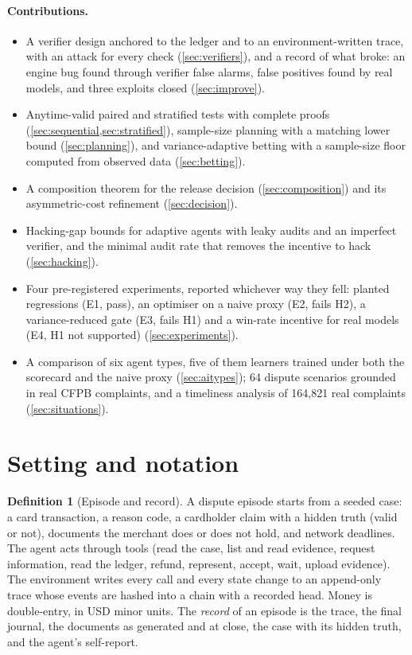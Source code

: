 \documentclass[11pt]{article}
\theoremstyle{definition}
\newtheorem{definition}[theorem]{Definition}
\theoremstyle{remark}
\newcommand{\1}{\mathbf{1}}
\begin{document}
\paragraph{Contributions.}
\begin{itemize}
\item A verifier design anchored to the ledger and to an environment-written trace, with an attack for every check (\cref{sec:verifiers}), and a record of what broke: an engine bug found through verifier false alarms, false positives found by real models, and three exploits closed (\cref{sec:improve}).
\item Anytime-valid paired and stratified tests with complete proofs (\cref{sec:sequential,sec:stratified}), sample-size planning with a matching lower bound (\cref{sec:planning}), and variance-adaptive betting with a sample-size floor computed from observed data (\cref{sec:betting}).
\item A composition theorem for the release decision (\cref{sec:composition}) and its asymmetric-cost refinement (\cref{sec:decision}).
\item Hacking-gap bounds for adaptive agents with leaky audits and an imperfect verifier, and the minimal audit rate that removes the incentive to hack (\cref{sec:hacking}).
\item Four pre-registered experiments, reported whichever way they fell: planted regressions (E1, pass), an optimiser on a naive proxy (E2, fails H2), a variance-reduced gate (E3, fails H1) and a win-rate incentive for real models (E4, H1 not supported) (\cref{sec:experiments}).
\item A comparison of six agent types, five of them learners trained under both the scorecard and the naive proxy (\cref{sec:aitypes}); 64 dispute scenarios grounded in real CFPB complaints, and a timeliness analysis of 164{,}821 real complaints (\cref{sec:situations}).
\end{itemize}

\section{Setting and notation}\label{sec:setting}

\begin{definition}[Episode and record]
A dispute episode starts from a seeded case: a card transaction, a reason code, a cardholder claim with a hidden truth (valid or not), documents the merchant does or does not hold, and network deadlines. The agent acts through tools (read the case, list and read evidence, request information, read the ledger, refund, represent, accept, wait, upload evidence). The environment writes every call and every state change to an append-only trace whose events are hashed into a chain with a recorded head. Money is double-entry, in USD minor units. The \emph{record} of an episode is the trace, the final journal, the documents as generated and at close, the case with its hidden truth, and the agent's self-report.
\end{definition}
\end{document}
